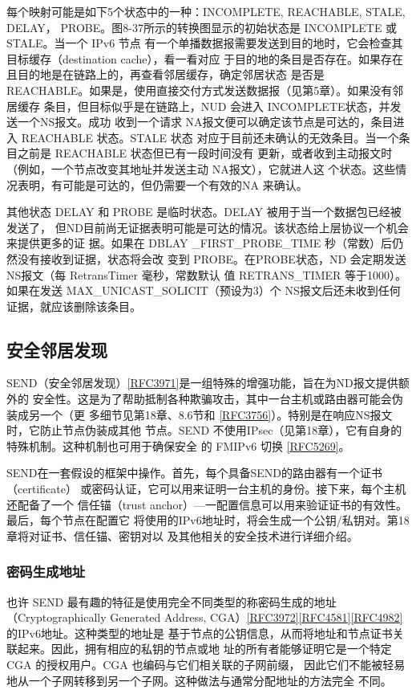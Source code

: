 每个映射可能是如下5个状态中的一种：INCOMPLETE, REACHABLE, STALE, DELAY，
PROBE。图8-37所示的转换图显示的初始状态是 INCOMPLETE 或 STALE。当一个 IPv6 节点
有一个单播数据报需要发送到目的地时，它会检查其目标缓存（destination cache），看一看对应
于目的地的条目是否存在。如果存在且目的地是在链路上的，再查看邻居缓存，确定邻居状态
是否是 REACHABLE。如果是，使用直接交付方式发送数据报（见第5章）。如果没有邻居缓存
条目，但目标似乎是在链路上，NUD 会进入 INCOMPLETE状态，并发送一个NS报文。成功
收到一个请求 NA报文便可以确定该节点是可达的，条目进入 REACHABLE 状态。STALE 状态
对应于目前还未确认的无效条目。当一个条目之前是 REACHABLE 状态但已有一段时间没有
更新，或者收到主动报文时（例如，一个节点改变其地址并发送主动 NA报文），它就进人这
个状态。这些情况表明，有可能是可达的，但仍需要一个有效的NA 来确认。

其他状态 DELAY 和 PROBE 是临时状态。DELAY 被用于当一个数据包已经被发送了，
但ND目前尚无证据表明可能是可达的情况。该状态给上层协议一个机会来提供更多的证
据。如果在 DBLAY \_FIRST\_PROBE\_TIME 秒（常数）后仍然没有接收到证据，状态将会改
变到 PROBE。在PROBE状态，ND 会定期发送NS报文（每 RetransTimer 毫秒，常数默认
值 RETRANS\_TIMER 等于1000）。如果在发送 MAX\_UNICAST\_SOLICIT（预设为3）个
NS报文后还未收到任何证据，就应该删除该条目。

\subsection{安全邻居发现}
SEND（安全邻居发现）\href{https://www.rfc-editor.org/rfc/rfc3971}{[RFC3971]}是一组特殊的增强功能，旨在为ND报文提供额外的
安全性。这是为了帮助抵制各种欺骗攻击，其中一台主机或路由器可能会伪装成另一个（更
多细节见第18章、8.6节和 \href{https://www.rfc-editor.org/rfc/rfc3756}{[RFC3756]}）。特别是在响应NS报文时，它防止节点伪装成其他
节点。SEND 不使用IPsec（见第18章），它有自身的特殊机制。这种机制也可用于确保安全
的 FMIPv6 切换 \href{https://www.rfc-editor.org/rfc/rfc5269}{[RFC5269]}。

SEND在一套假设的框架中操作。首先，每个具备SEND的路由器有一个证书
（certificate） 或密码认证，它可以用来证明一台主机的身份。接下来，每个主机还配备了一个
信任锚（trust anchor）—一配置信息可以用来验证证书的有效性。最后，每个节点在配置它
将使用的IPv6地址时，将会生成一个公钥/私钥对。第18章将对证书、信任锚、密钥对以
及其他相关的安全技术进行详细介绍。

\subsubsection{密码生成地址}
也许 SEND 最有趣的特征是使用完全不同类型的称密码生成的地址（Cryptographically
Generated Address, CGA）\href{https://www.rfc-editor.org/rfc/rfc3972}{[RFC3972]}\href{https://www.rfc-editor.org/rfc/rfc4581}{[RFC4581]}\href{https://www.rfc-editor.org/rfc/rfc4982}{[RFC4982]} 的IPv6地址。这种类型的地址是
基于节点的公钥信息，从而将地址和节点证书关联起来。因此，拥有相应的私钥的节点或地
址的所有者能够证明它是一个特定CGA 的授权用户。CGA 也编码与它们相关联的子网前缀，
因此它们不能被轻易地从一个子网转移到另一个子网。这种做法与通常分配地址的方法完全
不同。

